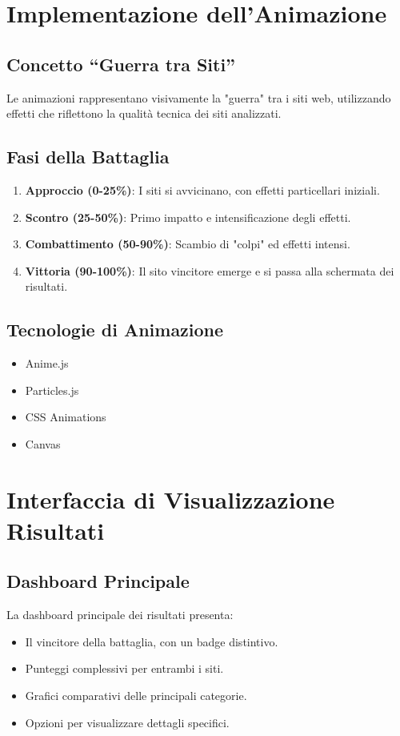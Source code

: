 \section{Implementazione dell'Animazione}

\subsection{Concetto ``Guerra tra Siti''}
Le animazioni rappresentano visivamente la "guerra" tra i siti web, utilizzando effetti che riflettono la qualità tecnica dei siti analizzati.

\subsection{Fasi della Battaglia}
\begin{enumerate}
    \item \textbf{Approccio (0-25\%)}: I siti si avvicinano, con effetti particellari iniziali.
    \item \textbf{Scontro (25-50\%)}: Primo impatto e intensificazione degli effetti.
    \item \textbf{Combattimento (50-90\%)}: Scambio di "colpi" ed effetti intensi.
    \item \textbf{Vittoria (90-100\%)}: Il sito vincitore emerge e si passa alla schermata dei risultati.
\end{enumerate}

\subsection{Tecnologie di Animazione}
\begin{itemize}
    \item Anime.js
    \item Particles.js
    \item CSS Animations
    \item Canvas
\end{itemize}

\section{Interfaccia di Visualizzazione Risultati}

\subsection{Dashboard Principale}
La dashboard principale dei risultati presenta:
\begin{itemize}
    \item Il vincitore della battaglia, con un badge distintivo.
    \item Punteggi complessivi per entrambi i siti.
    \item Grafici comparativi delle principali categorie.
    \item Opzioni per visualizzare dettagli specifici.
\end{itemize}

